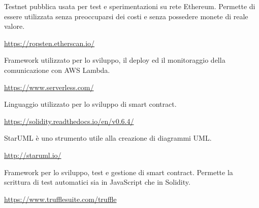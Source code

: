	Testnet pubblica usata per test e sperimentazioni su rete Ethereum. Permette di essere utilizzata senza preoccuparsi dei costi e senza possedere monete di reale valore.
	\begin{center}
		\url{https://ropsten.etherscan.io/}
	\end{center}

	Framework utilizzato per lo sviluppo, il deploy ed il monitoraggio della comunicazione con AWS Lambda.
	\begin{center}
		\url{https://www.serverless.com/}
	\end{center}

	Linguaggio utilizzato per lo sviluppo di smart contract.
	\begin{center}
		\url{https://solidity.readthedocs.io/en/v0.6.4/}
	\end{center}

	StarUML è uno strumento utile alla creazione di diagrammi UML.
	\begin{center}
		\url{http://staruml.io/}
	\end{center}

	Framework per lo sviluppo, test e gestione di smart contract. Permette la scrittura di test automatici sia in JavaScript che in Solidity.
	\begin{center}
		\url{https://www.trufflesuite.com/truffle}
	\end{center}

